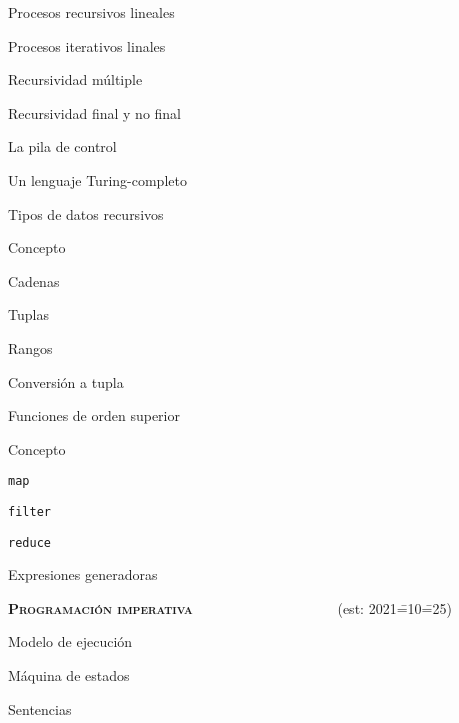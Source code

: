 \begin{longenum}
\begin{longenum}
\begin{longenum}
\begin{longenum}
                \begin{longenum}
                    \item Procesos recursivos lineales
                    \item Procesos iterativos linales
                \end{longenum}
                \item Recursividad múltiple
                \item Recursividad final y no final
            \end{longenum}
            \item La pila de control
            \item Un lenguaje Turing-completo
        \end{longenum}
        \item Tipos de datos recursivos
        \begin{longenum}
            \item Concepto
            \item Cadenas
            \item Tuplas
            \item Rangos
            \item Conversión a tupla
        \end{longenum}
        \item Funciones de orden superior
        \begin{longenum}
            \item Concepto
            \item \texttt{map}
            \item \texttt{filter}
            \item \texttt{reduce}
            \item Expresiones generadoras
        \end{longenum}
    \end{longenum}
    \item \textbf{\textsc{Programación imperativa}} \ \ \ \ \ \ \ \ \ \ \ \ \ \ \ \ \ \ \ \ (est: 2021\==10\==25)
    \begin{longenum}
        \item Modelo de ejecución
        \begin{longenum}
            \item Máquina de estados
            \item Sentencias

\end{longenum}
\end{longenum}
\end{longenum}
